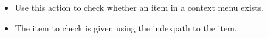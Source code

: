 
\begin{itemize}
\item Use this action to check whether an item in a context menu exists.
\item The item to check is given using the indexpath to the item. 
\end{itemize}



